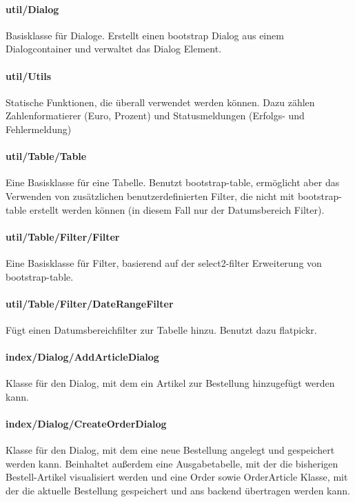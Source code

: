\documentclass[12pt,pdftex,parskip=half]{scrartcl}
\begin{document}
        \paragraph{util/Dialog}
        Basisklasse für Dialoge. Erstellt einen bootstrap Dialog aus einem Dialogcontainer und verwaltet das Dialog Element.

        \paragraph{util/Utils}
        Statische Funktionen, die überall verwendet werden können. Dazu zählen Zahlenformatierer (Euro, Prozent) und Statusmeldungen (Erfolgs- und Fehlermeldung)

        \paragraph{util/Table/Table}
        Eine Basisklasse für eine Tabelle. Benutzt bootstrap-table, ermöglicht aber das Verwenden von zusätzlichen benutzerdefinierten Filter, die nicht mit bootstrap-table erstellt werden können (in diesem Fall nur der Datumsbereich Filter).

        \paragraph{util/Table/Filter/Filter}
        Eine Basisklasse für Filter, basierend auf der select2-filter Erweiterung von bootstrap-table.

        \paragraph{util/Table/Filter/DateRangeFilter}
        Fügt einen Datumsbereichfilter zur Tabelle hinzu. Benutzt dazu flatpickr.


        \paragraph{index/Dialog/AddArticleDialog}
        Klasse für den Dialog, mit dem ein Artikel zur Bestellung hinzugefügt werden kann.

        \paragraph{index/Dialog/CreateOrderDialog}
        Klasse für den Dialog, mit dem eine neue Bestellung angelegt und gespeichert werden kann.
        Beinhaltet außerdem eine Ausgabetabelle, mit der die bisherigen Bestell-Artikel visualisiert werden und eine Order sowie OrderArticle Klasse, mit der die aktuelle Bestellung gespeichert und ans backend übertragen werden kann.
\end{document}
